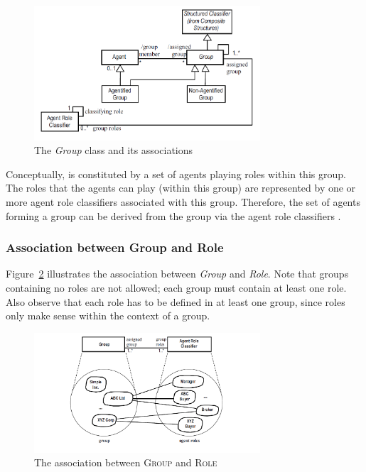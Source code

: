 \begin{figure}[ht]
	\centering
	\includegraphics[width=0.75\textwidth]{images/onp/group.png}
	\caption{The \textit{Group} class and its associations \cite{Odell05}}
	\label{figure:onp-group}
\end{figure}

Conceptually, is constituted by a set of agents playing roles within this group.
The roles that the agents can play (within this group) are represented by one or more agent role classifiers associated with this group.
Therefore, the set of agents forming a group can be derived from the group via the agent role classifiers \cite{Odell05}.

\subsubsection*{Association between Group and Role}

Figure~\ref{figure:onp-group-role-association} illustrates the association between \textit{Group} and \textit{Role}.
Note that groups containing no roles are not allowed; each group must contain at least one role.
Also observe that each role has to be defined in at least one group, since roles only make sense within the context of a group.

\begin{figure}[ht]
	\centering
	\includegraphics[width=0.75\textwidth]{images/onp/group-role-association.png}
	\caption{The association between \textsc{Group} and \textsc{Role} \cite{Odell05}}
	\label{figure:onp-group-role-association}
\end{figure}

